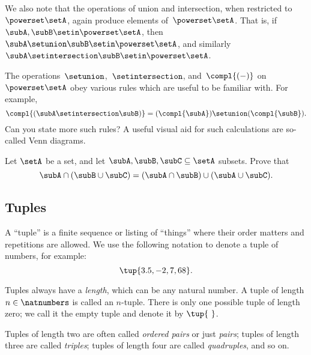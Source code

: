 We also note that the operations of union and intersection, when restricted to~$\powerset \setA$, again produce elements of~$\powerset \setA$.
That is, if~$\subA, \subB \setin\powerset \setA$, then~$\subA \setunion \subB \setin\powerset \setA$, and similarly~$\subA \setintersection \subB \setin\powerset \setA$.

The operations~$\setunion$,~$\setintersection$, and~$\compl{( - )}$ on~$\powerset \setA$ obey various rules which are useful to be familiar with.
For example,
\begin{equation*}
    \compl{(\subA \setintersection \subB)} = (\compl{\subA}) \setunion (\compl{\subB}).
\end{equation*}
Can you state more such rules?
A useful visual aid for such calculations are so-called Venn diagrams.


\begin{gradedexercise}
\label{ex:distributing-subsets}
Let $\setA$ be a set, and let $\subA, \subB, \subC \subseteq \setA$ subsets. Prove that
\begin{equation}
\subA \cap (\subB \cup \subC) = (\subA \cap \subB) \cup (\subA \cup \subC). 
\end{equation}
\end{gradedexercise}


\subsection{Tuples}
\label{sec:tuples}

A ``tuple'' is  a finite sequence or listing of ``things'' where their order matters and repetitions are allowed.
We use the following notation to denote a tuple of numbers, for example:
\begin{equation}
    \tup{3.5, -2, 7, 68}.
\end{equation}

Tuples always have a \emph{length}, which can be any natural number.
A tuple of length $n \in \natnumbers$ is called an $n$-tuple.
There is only one possible tuple of length zero; we call it the empty tuple and denote it by $\tup{ \ }$.

Tuples of length two are often called \emph{ordered pairs} or just \emph{pairs}; tuples of length three are called \emph{triples}; tuples of length four are called \emph{quadruples}, and so on.

